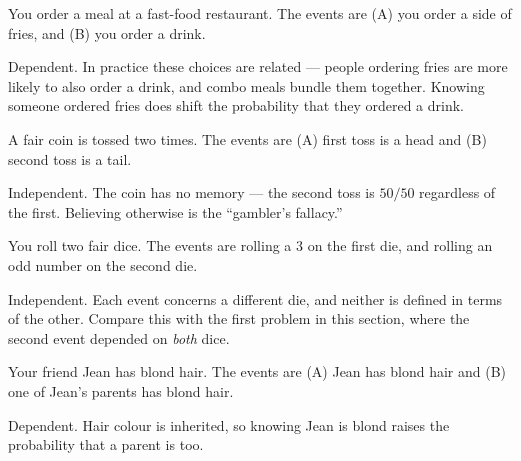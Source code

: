 \documentclass[12pt]{ximera}
\begin{document}
\begin{problem}
You order a meal at a fast-food restaurant. The events are (A) you order a side of fries,
and (B) you order a drink.
\begin{multipleChoice}
\end{multipleChoice}

\begin{solution}
Dependent. In practice these choices are related --- people ordering fries are more
likely to also order a drink, and combo meals bundle them together. Knowing someone
ordered fries does shift the probability that they ordered a drink.
\end{solution}
\end{problem}

\begin{problem}
A fair coin is tossed two times. The events are (A) first toss is a head and (B) second
toss is a tail.
\begin{multipleChoice}
\end{multipleChoice}

\begin{solution}
Independent. The coin has no memory --- the second toss is $50/50$ regardless of the
first. Believing otherwise is the ``gambler's fallacy.''
\end{solution}
\end{problem}

\begin{problem}
You roll two fair dice. The events are rolling a 3 on the first die, and rolling an odd
number on the second die.
\begin{multipleChoice}
\end{multipleChoice}

\begin{solution}
Independent. Each event concerns a different die, and neither is defined in terms of the
other. Compare this with the first problem in this section, where the second event
depended on \emph{both} dice.
\end{solution}
\end{problem}

\begin{problem}
Your friend Jean has blond hair. The events are (A) Jean has blond hair and (B) one of
Jean's parents has blond hair.
\begin{multipleChoice}
\end{multipleChoice}

\begin{solution}
Dependent. Hair colour is inherited, so knowing Jean is blond raises the probability that
a parent is too.
\end{solution}
\end{problem}
\end{document}
